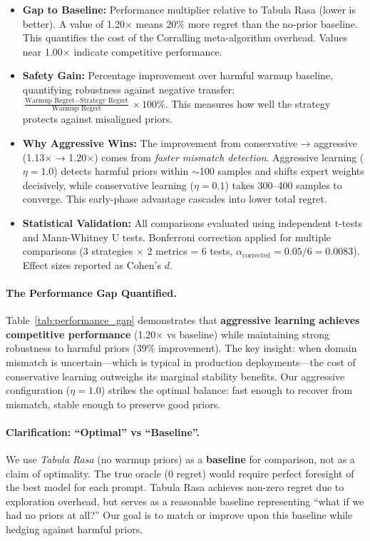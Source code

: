 \begin{table}[t]
\begin{itemize}[leftmargin=*,nosep]
\item \textbf{Gap to Baseline:} Performance multiplier relative to Tabula Rasa (lower is better). A value of 1.20$\times$ means 20\% more regret than the no-prior baseline. This quantifies the cost of the Corralling meta-algorithm overhead. Values near 1.00$\times$ indicate competitive performance.

\item \textbf{Safety Gain:} Percentage improvement over harmful warmup baseline, quantifying robustness against negative transfer: $\frac{\text{Warmup Regret} - \text{Strategy Regret}}{\text{Warmup Regret}} \times 100\%$. This measures how well the strategy protects against misaligned priors.

\item \textbf{Why Aggressive Wins:} The improvement from conservative → aggressive (1.13$\times$ → 1.20$\times$) comes from \emph{faster mismatch detection}. Aggressive learning ($\eta=1.0$) detects harmful priors within $\sim$100 samples and shifts expert weights decisively, while conservative learning ($\eta=0.1$) takes 300--400 samples to converge. This early-phase advantage cascades into lower total regret.

\item \textbf{Statistical Validation:} All comparisons evaluated using independent t-tests and Mann-Whitney U tests. Bonferroni correction applied for multiple comparisons (3 strategies $\times$ 2 metrics = 6 tests, $\alpha_{\text{corrected}} = 0.05/6 = 0.0083$). Effect sizes reported as Cohen's $d$.
\end{itemize}

\vspace{0.5em}
\paragraph{The Performance Gap Quantified.}
Table~\ref{tab:performance_gap} demonstrates that \textbf{aggressive learning achieves competitive performance} (1.20$\times$ vs baseline) while maintaining strong robustness to harmful priors (39\% improvement). The key insight: when domain mismatch is uncertain—which is typical in production deployments—the cost of conservative learning outweighs its marginal stability benefits. Our aggressive configuration ($\eta=1.0$) strikes the optimal balance: fast enough to recover from mismatch, stable enough to preserve good priors.

\paragraph{Clarification: ``Optimal'' vs ``Baseline''.}
We use \emph{Tabula Rasa} (no warmup priors) as a \textbf{baseline} for comparison, not as a claim of optimality. The true oracle (0 regret) would require perfect foresight of the best model for each prompt. Tabula Rasa achieves non-zero regret due to exploration overhead, but serves as a reasonable baseline representing ``what if we had no priors at all?'' Our goal is to match or improve upon this baseline while hedging against harmful priors.


\end{table}
